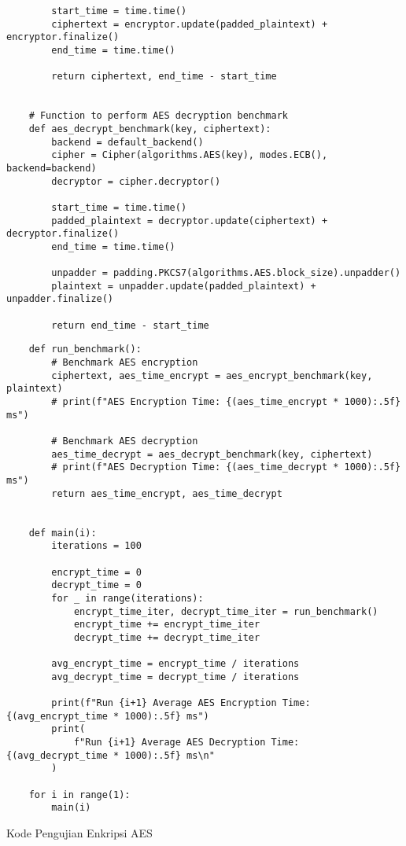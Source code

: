 \begin{listing}
\begin{verbatim}
        start_time = time.time()
        ciphertext = encryptor.update(padded_plaintext) + encryptor.finalize()
        end_time = time.time()

        return ciphertext, end_time - start_time


    # Function to perform AES decryption benchmark
    def aes_decrypt_benchmark(key, ciphertext):
        backend = default_backend()
        cipher = Cipher(algorithms.AES(key), modes.ECB(), backend=backend)
        decryptor = cipher.decryptor()

        start_time = time.time()
        padded_plaintext = decryptor.update(ciphertext) + decryptor.finalize()
        end_time = time.time()

        unpadder = padding.PKCS7(algorithms.AES.block_size).unpadder()
        plaintext = unpadder.update(padded_plaintext) + unpadder.finalize()

        return end_time - start_time
    \end{verbatim}
\end{listing}
\begin{listing}
    \begin{verbatim}
    def run_benchmark():
        # Benchmark AES encryption
        ciphertext, aes_time_encrypt = aes_encrypt_benchmark(key, plaintext)
        # print(f"AES Encryption Time: {(aes_time_encrypt * 1000):.5f} ms")

        # Benchmark AES decryption
        aes_time_decrypt = aes_decrypt_benchmark(key, ciphertext)
        # print(f"AES Decryption Time: {(aes_time_decrypt * 1000):.5f} ms")
        return aes_time_encrypt, aes_time_decrypt


    def main(i):
        iterations = 100

        encrypt_time = 0
        decrypt_time = 0
        for _ in range(iterations):
            encrypt_time_iter, decrypt_time_iter = run_benchmark()
            encrypt_time += encrypt_time_iter
            decrypt_time += decrypt_time_iter

        avg_encrypt_time = encrypt_time / iterations
        avg_decrypt_time = decrypt_time / iterations

        print(f"Run {i+1} Average AES Encryption Time: {(avg_encrypt_time * 1000):.5f} ms")
        print(
            f"Run {i+1} Average AES Decryption Time: {(avg_decrypt_time * 1000):.5f} ms\n"
        )
        
    for i in range(1):
        main(i)
    \end{verbatim}
    \caption{Kode Pengujian Enkripsi AES}
    \label{code:pengujian_enkripsi_aes}
\end{listing}


